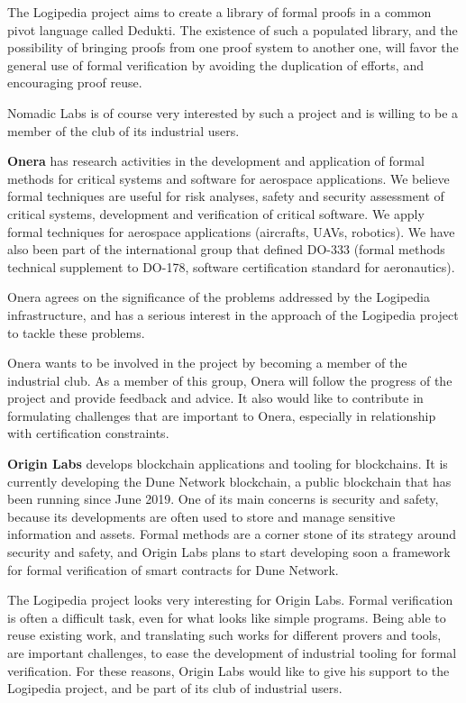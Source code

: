 {The Logipedia project aims to create a library of formal proofs in a
common pivot language called Dedukti. The existence of such a
populated library, and the possibility of bringing proofs from one
proof system to another one, will favor the general use of formal
verification by avoiding the duplication of efforts, and encouraging
proof reuse.

Nomadic Labs is of course very interested by such a project and is
willing to be a member of the club of its industrial users.


{\bf Onera} has research activities in the development and application
of formal methods for critical systems and software for aerospace
applications. We believe formal techniques are useful for risk
analyses, safety and security assessment of critical systems,
development and verification of critical software. We apply formal
techniques for aerospace applications (aircrafts, UAVs, robotics). We
have also been part of the international group that defined DO-333
(formal methods technical supplement to DO-178, software certification
standard for aeronautics).

Onera agrees on the significance of the problems addressed by the
Logipedia infrastructure, and has a serious interest in the approach
of the Logipedia project to tackle these problems.

Onera wants to be involved in the project by becoming a member of the
industrial club. As a member of this group, Onera will follow the
progress of the project and provide feedback and advice. It also would
like to contribute in formulating challenges that are important to
Onera, especially in relationship with certification constraints.

{\bf Origin Labs} develops blockchain applications and tooling for
blockchains. It is currently developing the Dune Network blockchain, a
public blockchain that has been running since June 2019. One of its
main concerns is security and safety, because its developments are
often used to store and manage sensitive information and
assets. Formal methods are a corner stone of its strategy around
security and safety, and Origin Labs plans to start developing soon a
framework for formal verification of smart contracts for Dune Network.

The Logipedia project looks very interesting for Origin Labs. Formal
verification is often a difficult task, even for what looks like
simple programs. Being able to reuse existing work, and translating
such works for different provers and tools, are important challenges,
to ease the development of industrial tooling for formal
verification. For these reasons, Origin Labs would like to give his
support to the Logipedia project, and be part of its club of
industrial users.

}
